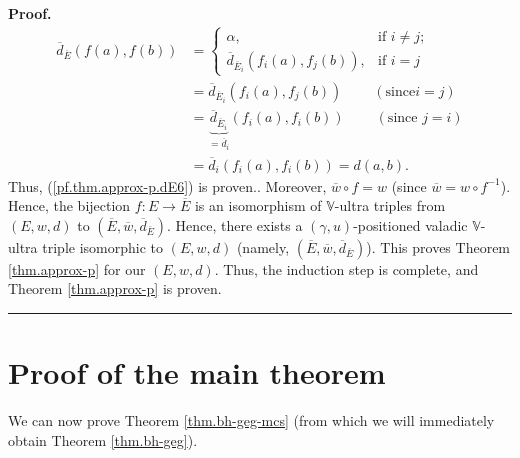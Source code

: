 \documentclass[numbers=enddot,12pt,final,onecolumn,notitlepage]{scrartcl}%
\theoremstyle{definition}
\newenvironment{proof}[1][Proof]{\noindent\textbf{#1.} }{\ \rule{0.5em}{0.5em}}
\theoremstyle{plainsl}
\begin{document}
\begin{proof}
{\begin{align*}
\overline{d}_{\overline{E}}\left(  f\left(  a\right)  ,f\left(  b\right)
\right)   &  =%
\begin{cases}
\alpha, & \text{if }i\neq j;\\
\overline{d}_{\overline{E}_{i}}\left(  f_{i}\left(  a\right)  ,f_{j}\left(
b\right)  \right)  , & \text{if }i=j
\end{cases}
\\
&  =\overline{d}_{\overline{E}_{i}}\left(  f_{i}\left(  a\right)
,f_{j}\left(  b\right)  \right)  \ \ \ \ \ \ \ \ \ \ \left(  \text{since
}i=j\right) \\
&  =\underbrace{\overline{d}_{\overline{E}_{i}}}_{=\overline{d}_{i}}\left(
f_{i}\left(  a\right)  ,f_{i}\left(  b\right)  \right)
\ \ \ \ \ \ \ \ \ \ \left(  \text{since }j=i\right) \\
&  =\overline{d}_{i}\left(  f_{i}\left(  a\right)  ,f_{i}\left(  b\right)
\right)  =d\left(  a,b\right)  .
\end{align*}
Thus, (\ref{pf.thm.approx-p.dE6}) is proven.}. Moreover, $\overline{w}\circ
f=w$ (since $\overline{w}=w\circ f^{-1}$). Hence, the bijection
$f:E\rightarrow\overline{E}$ is an isomorphism of $\mathbb{V}$-ultra triples
from $\left(  E,w,d\right)  $ to $\left(  \overline{E},\overline{w}%
,\overline{d}_{\overline{E}}\right)  $. Hence, there exists a $\left(
\gamma,u\right)  $-positioned valadic $\mathbb{V}$-ultra triple isomorphic to
$\left(  E,w,d\right)  $ (namely, $\left(  \overline{E},\overline{w}%
,\overline{d}_{\overline{E}}\right)  $). This proves Theorem
\ref{thm.approx-p} for our $\left(  E,w,d\right)  $. Thus, the induction step
is complete, and Theorem \ref{thm.approx-p} is proven.
\end{proof}

\section{\label{sect.main-proof}Proof of the main theorem}

We can now prove Theorem \ref{thm.bh-geg-mcs} (from which we will immediately
obtain Theorem \ref{thm.bh-geg}).
\end{document}
